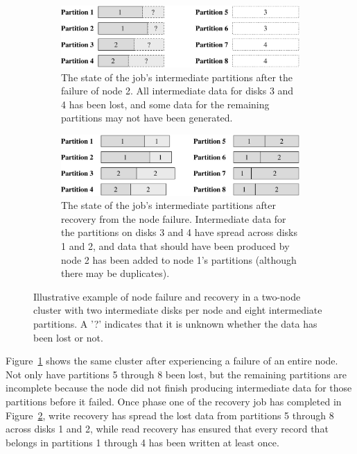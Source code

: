 \begin{figure}[t]
  \centering
  \begin{subfigure}[t]{\columnwidth}
    \centering
    \includegraphics[width=\textwidth]{fault_tolerance/figures/node_failure_before_recovery}
    \caption{\label{fig:node_fail_before} The state of the job's intermediate
      partitions after the failure of node 2. All intermediate data for disks 3
      and 4 has been lost, and some data for the remaining partitions may not
      have been generated.}
  \end{subfigure}\hspace{0.05\textwidth}
  \begin{subfigure}[t]{\columnwidth}
    \centering
    \includegraphics[width=\textwidth]{fault_tolerance/figures/node_failure_after_recovery}
    \caption{\label{fig:node_fail_after} The state of the job's intermediate
      partitions after recovery from the node failure. Intermediate data for
      the partitions on disks 3 and 4 have spread across disks 1 and 2, and
      data that should have been produced by node 2 has been added to node 1's
      partitions (although there may be duplicates).}
  \end{subfigure}
  \caption{\label{fig:node_fail} Illustrative example of node failure and
    recovery in a two-node cluster with two intermediate disks per node and
    eight intermediate partitions. A '?' indicates that it is unknown
    whether the data has been lost or not.}
\end{figure}

Figure~\ref{fig:node_fail_before} shows the same cluster after experiencing a
failure of an entire node. Not only have partitions 5 through 8 been lost, but
the remaining partitions are incomplete because the node did not finish
producing intermediate data for those partitions before it failed. Once phase
one of the recovery job has completed in Figure~\ref{fig:node_fail_after},
write recovery has spread the lost data from partitions 5 through 8 across
disks 1 and 2, while read recovery has ensured that every record that belongs
in partitions 1 through 4 has been written at least once.

